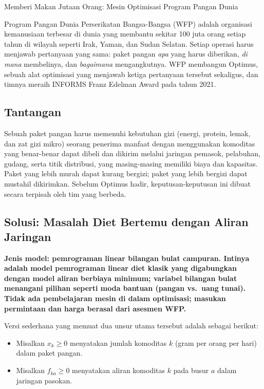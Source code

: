 \begin{casestudybox}{Memberi Makan Jutaan Orang: Mesin Optimisasi Program Pangan Dunia}
\label{case:wfp}

Program Pangan Dunia Perserikatan Bangsa-Bangsa (WFP) adalah organisasi kemanusiaan terbesar di dunia yang membantu sekitar 100 juta orang setiap tahun di wilayah seperti Irak, Yaman, dan Sudan Selatan. Setiap operasi harus menjawab pertanyaan yang sama: paket pangan \emph{apa} yang harus diberikan, \emph{di mana} membelinya, dan \emph{bagaimana} mengangkutnya. WFP membangun Optimus, sebuah alat optimisasi yang menjawab ketiga pertanyaan tersebut sekaligus, dan timnya meraih INFORMS Franz Edelman Award pada tahun 2021.

\subsection*{Tantangan}
Sebuah paket pangan harus memenuhi kebutuhan gizi (energi, protein, lemak, dan zat gizi mikro) seorang penerima manfaat dengan menggunakan komoditas yang benar-benar dapat dibeli dan dikirim melalui jaringan pemasok, pelabuhan, gudang, serta titik distribusi, yang masing-masing memiliki biaya dan kapasitas. Paket yang lebih murah dapat kurang bergizi; paket yang lebih bergizi dapat mustahil dikirimkan. Sebelum Optimus hadir, keputusan-keputusan ini dibuat secara terpisah oleh tim yang berbeda.

\subsection*{Solusi: Masalah Diet Bertemu dengan Aliran Jaringan}
\textbf{Jenis model: pemrograman linear bilangan bulat campuran. Intinya adalah model pemrograman linear diet klasik yang digabungkan dengan model aliran berbiaya minimum; variabel bilangan bulat menangani pilihan seperti moda bantuan (pangan vs.\ uang tunai). Tidak ada pembelajaran mesin di dalam optimisasi; masukan permintaan dan harga berasal dari asesmen WFP.}

Versi sederhana yang memuat dua unsur utama tersebut adalah sebagai berikut:

\begin{itemize}
\item Misalkan $x_k \geq 0$ menyatakan jumlah komoditas $k$ (gram per orang per hari) dalam paket pangan.
\item Misalkan $f_{ka} \geq 0$ menyatakan aliran komoditas $k$ pada busur $a$ dalam jaringan pasokan.
\end{itemize}


\end{casestudybox}
